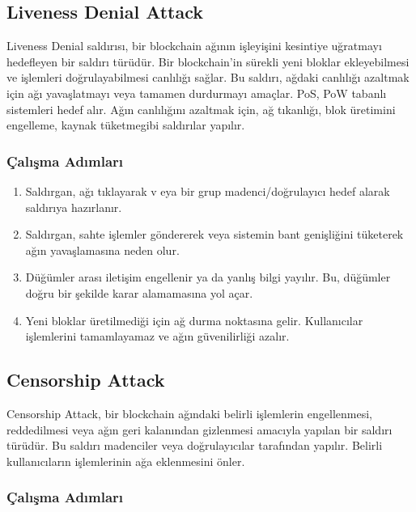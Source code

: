 \newpage

\subsection{Liveness Denial Attack}

Liveness Denial saldırısı, bir blockchain ağının işleyişini kesintiye uğratmayı hedefleyen bir saldırı türüdür. Bir blockchain'in sürekli yeni bloklar ekleyebilmesi ve işlemleri doğrulayabilmesi canlılığı sağlar. Bu saldırı, ağdaki canlılığı azaltmak için ağı yavaşlatmayı veya tamamen durdurmayı amaçlar. PoS, PoW tabanlı sistemleri hedef alır. Ağın canlılığını azaltmak için, ağ tıkanlığı, blok üretimini engelleme, kaynak tüketmegibi saldırılar yapılır.

\subsubsection{Çalışma Adımları}

\begin{enumerate}
    \item Saldırgan, ağı tıklayarak v eya bir grup madenci/doğrulayıcı hedef alarak saldırıya hazırlanır.
    \item Saldırgan, sahte işlemler göndererek veya sistemin bant genişliğini tüketerek ağın yavaşlamasına neden olur.
    \item Düğümler arası iletişim engellenir ya da yanlış bilgi yayılır. Bu, düğümler doğru bir şekilde karar alamamasına yol açar.
    \item Yeni bloklar üretilmediği için ağ durma noktasına gelir. Kullanıcılar işlemlerini tamamlayamaz ve ağın güvenilirliği azalır.
\end{enumerate}

\newpage

\subsection{Censorship Attack}

Censorship Attack, bir blockchain ağındaki belirli işlemlerin engellenmesi, reddedilmesi veya ağın geri kalanından gizlenmesi amacıyla yapılan bir saldırı türüdür. Bu saldırı madenciler veya doğrulayıcılar tarafından yapılır. Belirli kullanıcıların işlemlerinin ağa eklenmesini önler.

\subsubsection{Çalışma Adımları}

